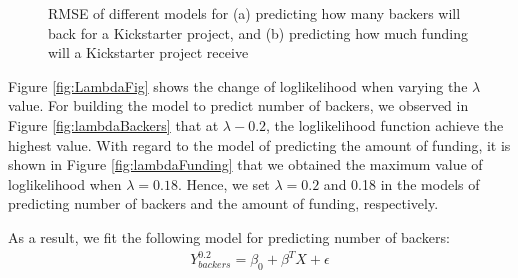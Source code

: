\begin{figure}[!ht]
	\centering
	\hspace{1cm}
	\caption{RMSE of different models for (a) predicting how many backers will back for a Kickstarter project, and (b) predicting how much funding will a Kickstarter project receive}
	\label{fig:RegressionResult}
	\vspace{-10pt}
\end{figure}
Figure \ref{fig:LambdaFig} shows the change of loglikelihood when varying the $\lambda$ value. For building the model to predict number of backers, we observed in Figure \ref{fig:lambdaBackers} that at $\lambda-0.2$, the loglikelihood function achieve the highest value. With regard to the model of predicting the amount of funding, it is shown in Figure \ref{fig:lambdaFunding} that we obtained the maximum value of loglikelihood when $\lambda = 0.18$. Hence, we set $\lambda = 0.2$ and 0.18 in the models of predicting number of backers and the amount of funding, respectively.

As a result, we fit the following model for predicting number of backers:
\begin{equation}
\label{equa:model1 }
\begin{aligned}
	Y_{backers}^{0.2} = \beta_0 + \beta^TX + \epsilon 
\end{aligned}
\end{equation}

